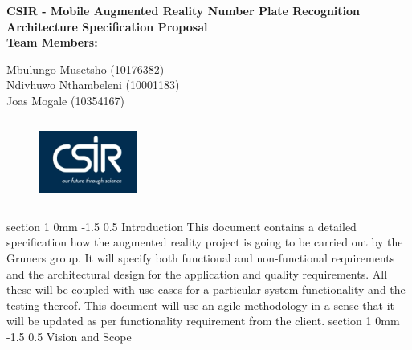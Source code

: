\documentclass[12pt]{article}
\makeatletter
\newcommand{\Title}{CSIR - Mobile Augmented Reality Number Plate Recognition} %
\renewcommand{\section}{\@startsection
   {section}%
   {1}%
   {0mm}%
   {-1.5\baselineskip}%
   {0.5\baselineskip}%
   {\sffamily\bfseries\upshape\normalsize}}%
\makeatother
\begin{document}
        \vspace{4em}
        
        \begin{center}%
        
          \LARGE \bf \Title \\[4em]
          \LARGE {\bf Architecture Specification Proposal}\\[1em]
          \LARGE {\bf Team Members:}\\[2em]
          \large
          
             Mbulungo Musetsho                          (10176382)  \\[1em]
             Ndivhuwo Nthambeleni 						(10001183)	\\[1em]
             Joas Mogale 								(10354167)	\\[1em]
            
        \end{center}%
        \begin{figure}[h]
	           \centering
	           \includegraphics[width=1.27in, height=1.09in]{Pictures/csir.png}
	   	\end{figure}
	    \FloatBarrier
        

        \newpage
        \tableofcontents    
                \newpage
                \section{Introduction}
                		This document contains a detailed specification how the augmented reality project is going to be carried out by the Gruners group. It will specify both functional and non-functional requirements and the architectural design for the application and quality requirements. All these will be coupled with use cases for a particular system functionality and the testing thereof. This document will use an agile methodology in a sense that it will be updated as per functionality requirement from the client. 
                \section{Vision and Scope}
\end{document}
